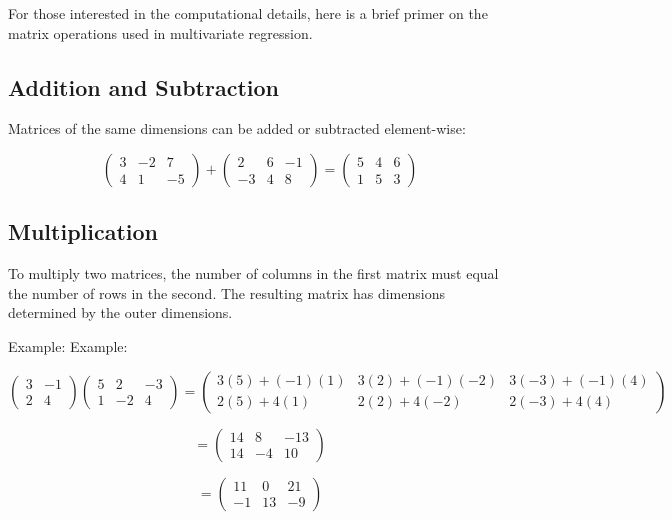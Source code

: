 \documentclass[
  letterpaper,
  DIV=11,
  numbers=noendperiod]{scrreprt}
\begin{document}
For those interested in the computational details, here is a brief
primer on the matrix operations used in multivariate regression.

\subsection{Addition and Subtraction}\label{addition-and-subtraction}

Matrices of the same dimensions can be added or subtracted element-wise:

\[
\begin{pmatrix} 3 & -2 & 7 \\ 4 & 1 & -5 \end{pmatrix} + \begin{pmatrix} 2 & 6 & -1 \\ -3 & 4 & 8 \end{pmatrix} = \begin{pmatrix} 5 & 4 & 6 \\ 1 & 5 & 3 \end{pmatrix}
\]

\subsection{Multiplication}\label{multiplication}

To multiply two matrices, the number of columns in the first matrix must
equal the number of rows in the second. The resulting matrix has
dimensions determined by the outer dimensions.

Example: Example:

\[
\begin{pmatrix} 3 & -1 \\ 2 & 4 \end{pmatrix} \begin{pmatrix} 5 & 2 & -3 \\ 1 & -2 & 4 \end{pmatrix} = \begin{pmatrix} 3(5) + (-1)(1) & 3(2) + (-1)(-2) & 3(-3) + (-1)(4) \\ 2(5) + 4(1) & 2(2) + 4(-2) & 2(-3) + 4(4) \end{pmatrix}
\]

\[
= \begin{pmatrix} 14 & 8 & -13 \\ 14 & -4 & 10 \end{pmatrix}
\]

\[
= \begin{pmatrix} 11 & 0 & 21 \\ -1 & 13 & -9 \end{pmatrix}
\]
\end{document}
